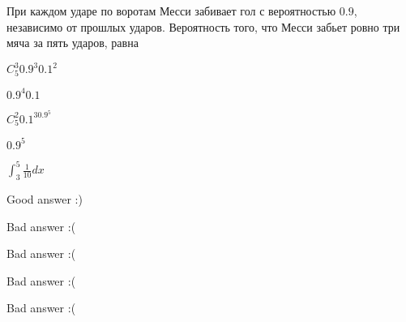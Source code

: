 
\begin{question}
При каждом ударе по воротам Месси забивает гол с вероятностью \(0.9\),
независимо от прошлых ударов. Вероятность того, что Месси забьет ровно
три мяча за пять ударов, равна
\begin{answerlist}
  \item \(C_{5}^{3}0.9^{3}0.1^2\)
  \item \(0.9^{4}0.1\)
  \item \(C_{5}^{2}0.1^30.9^5\)
  \item \(0.9^5\)
  \item \(\int_{3}^{5}\frac{1}{10}dx\)
\end{answerlist}
\end{question}

\begin{solution}
\begin{answerlist}
  \item Good answer :)
  \item Bad answer :(
  \item Bad answer :(
  \item Bad answer :(
  \item Bad answer :(
\end{answerlist}
\end{solution}

